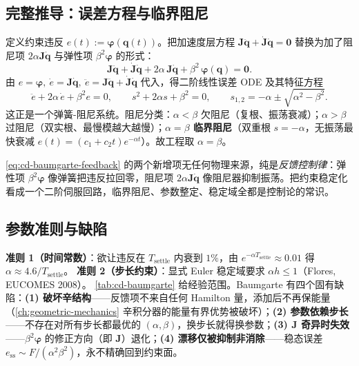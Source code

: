\subsection{完整推导：误差方程与临界阻尼}
定义约束违反 $e(t):=\boldsymbol\varphi(\mathbf q(t))$。把加速度层方程 $\mathbf J\ddot{\mathbf q}+\dot{\mathbf J}\dot{\mathbf q}=\mathbf 0$ 替换为加了阻尼项 $2\alpha\mathbf J\dot{\mathbf q}$ 与弹性项 $\beta^2\boldsymbol\varphi$ 的形式：
\begin{equation}
  \mathbf J\ddot{\mathbf q}+\dot{\mathbf J}\dot{\mathbf q}+2\alpha\,\mathbf J\dot{\mathbf q}+\beta^2\,\boldsymbol\varphi(\mathbf q)=\mathbf 0.
  \label{eq:cd-baumgarte-feedback}
\end{equation}
由 $e=\boldsymbol\varphi,\ \dot e=\mathbf J\dot{\mathbf q},\ \ddot e=\mathbf J\ddot{\mathbf q}+\dot{\mathbf J}\dot{\mathbf q}$ 代入，得二阶线性误差 ODE 及其特征方程
\begin{equation}
  \ddot e+2\alpha\,\dot e+\beta^2 e=0,\qquad s^2+2\alpha s+\beta^2=0,\qquad s_{1,2}=-\alpha\pm\sqrt{\alpha^2-\beta^2}.
  \label{eq:cd-baumgarte-error}
\end{equation}
这正是一个弹簧-阻尼系统。阻尼分类：$\alpha<\beta$ 欠阻尼（复根、振荡衰减）；$\alpha>\beta$ 过阻尼（双实根、最慢模越大越慢）；\textbf{$\alpha=\beta$ 临界阻尼}（双重根 $s=-\alpha$，无振荡最快衰减 $e(t)=(c_1+c_2t)e^{-\alpha t}$）。故工程取 $\alpha=\beta$。

\begin{insight}
\cref{eq:cd-baumgarte-feedback} 的两个新增项无任何物理来源，纯是\emph{反馈控制律}：弹性项 $\beta^2\boldsymbol\varphi$ 像弹簧把违反拉回零，阻尼项 $2\alpha\mathbf J\dot{\mathbf q}$ 像阻尼器抑制振荡。把约束稳定化看成一个二阶伺服回路，临界阻尼、参数整定、稳定域全都是控制论的常识。
\end{insight}

\subsection{参数准则与缺陷}
\textbf{准则 1（时间常数）}：欲让违反在 $T_{\text{settle}}$ 内衰到 $1\%$，由 $e^{-\alpha T_{\text{settle}}}\approx0.01$ 得 $\alpha\approx4.6/T_{\text{settle}}$。\;
\textbf{准则 2（步长约束）}：显式 Euler 稳定域要求 $\alpha h\le1$（Flores, EUCOMES 2008）。\;
\cref{tab:cd-baumgarte} 给经验范围。Baumgarte 有四个固有缺陷：\textbf{(1) 破坏辛结构}——反馈项不来自任何 Hamilton 量，添加后不再保能量（\cref{ch:geometric-mechanics} 辛积分器的能量有界优势被破坏）；\textbf{(2) 参数依赖步长}——不存在对所有步长都最优的 $(\alpha,\beta)$，换步长就得换参数；\textbf{(3) $\mathbf J$ 奇异时失效}——$\beta^2\boldsymbol\varphi$ 的修正方向（即 $\mathbf J$）退化；\textbf{(4) 漂移仅被抑制非消除}——稳态误差 $e_{\text{ss}}\sim F/(\alpha^2\beta^2)$，永不精确回到约束面。

